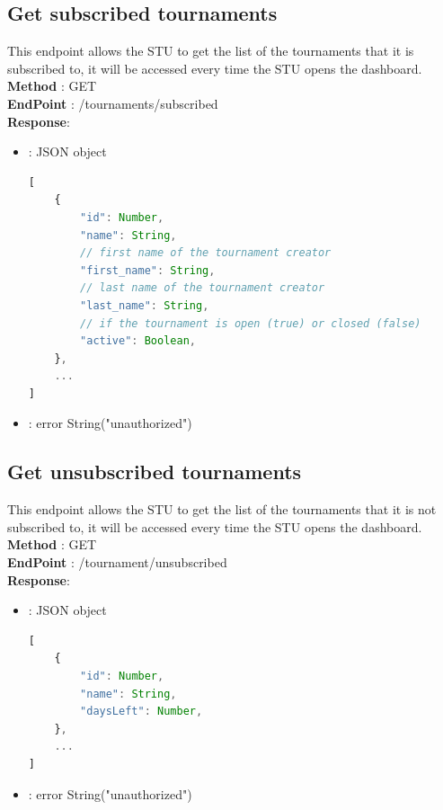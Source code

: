 \subsection*{Get subscribed tournaments}
This endpoint allows the STU to get the list of the tournaments that it is subscribed to, it will be accessed every time the STU opens the dashboard.\\
\textbf{Method} : GET \\
\textbf{EndPoint} : /tournaments/subscribed     \\
\textbf{Response}:
\begin{itemize}
    \item {} : JSON object
          \begin{lstlisting}[language=JavaScript, label={lst:jscode}, basicstyle=\ttfamily]
[
    {
        "id": Number,
        "name": String,
        // first name of the tournament creator
        "first_name": String,
        // last name of the tournament creator
        "last_name": String,
        // if the tournament is open (true) or closed (false)
        "active": Boolean,
    },
    ...
]
            \end{lstlisting}
    \item {} : error String("unauthorized")
\end{itemize}

\subsection*{Get unsubscribed tournaments}
This endpoint allows the STU to get the list of the tournaments that it is not subscribed to, it will be accessed every time the STU opens the dashboard.\\
\textbf{Method} : GET \\
\textbf{EndPoint} : /tournament/unsubscribed     \\
\textbf{Response}:
\begin{itemize}
    \item {} : JSON object
          \begin{lstlisting}[language=JavaScript, label={lst:jscode}, basicstyle=\ttfamily]
[
    {
        "id": Number,
        "name": String,
        "daysLeft": Number,
    },
    ...
]
        \end{lstlisting}
    \item {} : error String("unauthorized")
\end{itemize}

